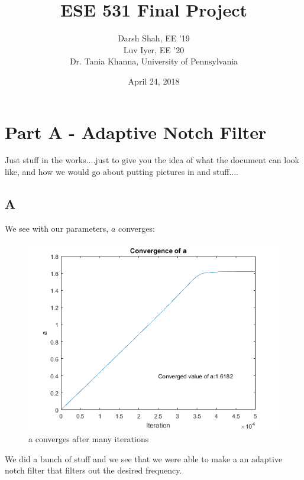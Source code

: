 \documentclass[12pt, letterpaper]{article}
\title{ESE 531 Final Project}
\author{Darsh Shah, EE '19 
\\ Luv Iyer, EE '20 \\ Dr. Tania Khanna, University of Pennsylvania}
\date{April 24, 2018}
\begin{document}
	\maketitle
	
	\newpage
	
	\section{Part A - Adaptive Notch Filter}
	
	Just stuff in the works....just to give you the idea of what the document can look like, and how we would go about putting pictures in and stuff....
	
	\subsection{A}
	
	We see with our parameters, $a$ converges:
	
	\begin{figure}[H]
		\centering
		\includegraphics[width=\textwidth]{pAaconvergencea}
		
		\caption{a converges after many iterations}	
	\end{figure}
	
	We did a bunch of stuff and we see that we were able to make a an adaptive notch filter that filters out the desired frequency.
	
\end{document}
